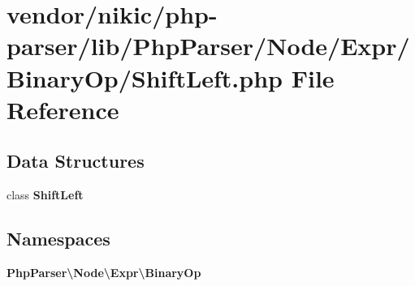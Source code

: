 \section{vendor/nikic/php-\/parser/lib/\+Php\+Parser/\+Node/\+Expr/\+Binary\+Op/\+Shift\+Left.php File Reference}
\label{_binary_op_2_shift_left_8php}
\subsection*{Data Structures}
\begin{DoxyCompactItemize}
\item 
class {\bf Shift\+Left}
\end{DoxyCompactItemize}
\subsection*{Namespaces}
\begin{DoxyCompactItemize}
\item 
 {\bf Php\+Parser\textbackslash{}\+Node\textbackslash{}\+Expr\textbackslash{}\+Binary\+Op}
\end{DoxyCompactItemize}
